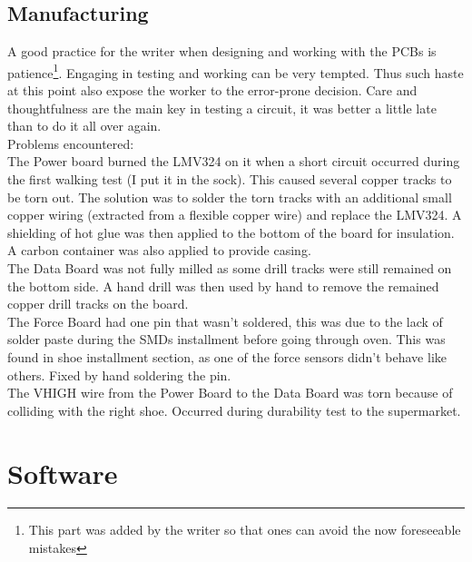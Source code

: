 \documentclass[12 pt, a4paper]{thesis}
\begin{document}
\subsection{Manufacturing}
A good practice for the writer when designing and working with the PCBs is patience\footnote{This part was added by the writer so that ones can avoid the now foreseeable mistakes}. Engaging in testing and working can be very tempted. Thus such haste at this point  also expose the worker to the error-prone decision. Care and thoughtfulness are the main key in testing a circuit, it was better a little late than to do it all over again.\\
Problems encountered:\\
The Power board burned the LMV324 on it when a short circuit occurred during the first walking test (I put it in the sock). This caused several copper tracks to be torn out. The solution was to solder the torn tracks with an additional small copper wiring (extracted from a flexible copper wire) and replace the LMV324. A shielding of hot glue was then applied to the bottom of the board for insulation. A carbon container was also applied to provide casing.\\
The Data Board was not fully milled as some drill tracks were still remained on the bottom side. A hand drill was then used by hand to remove the remained copper drill tracks on the board.\\
The Force Board had one pin that wasn't soldered, this was due to the lack of solder paste during the SMDs installment before going through oven. This was found in shoe installment section, as one of the force sensors didn't behave like others. Fixed by hand soldering the pin.\\
The VHIGH wire from the Power Board to the Data Board was torn because of colliding with the right shoe. Occurred during durability test to the supermarket.\\
\section{Software}
\end{document}
